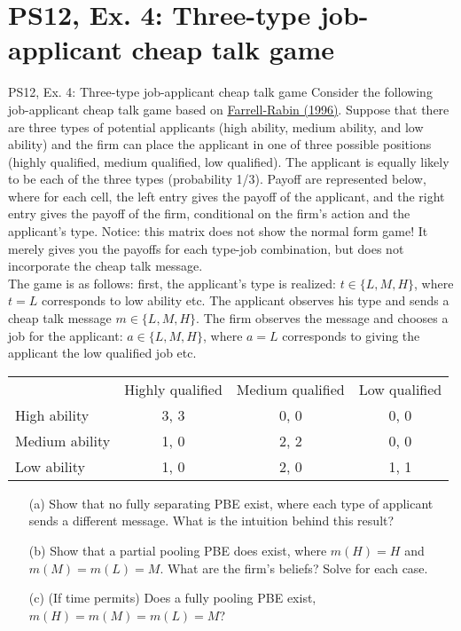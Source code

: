 \section{PS12, Ex. 4: Three-type job-applicant cheap talk game}

\begin{frame}{PS12, Ex. 4: Three-type job-applicant cheap talk game}
    Consider the following job-applicant cheap talk game based on \href{https://www.aeaweb.org/articles?id=10.1257/jep.10.3.103}{Farrell-Rabin (1996)}. Suppose that there are three types of potential applicants (high ability, medium ability, and low ability) and the firm can place the applicant in one of three possible positions (highly qualified, medium qualified, low qualified). The applicant is equally likely to be each of the three types (probability 1/3). Payoff are represented below, where for each cell, the left entry gives the payoff of the applicant, and the right entry gives the payoff of the firm, conditional on the firm’s action and the applicant’s type. Notice: this matrix does not show the normal form game! It merely gives you the payoffs for each type-job combination, but does not incorporate the cheap talk message.\\
    The game is as follows: first, the applicant’s type is realized: $t\in\{L,M,H\}$, where $t=L$ corresponds to low ability etc. The applicant observes his type and sends a cheap talk message $m\in\{L,M,H\}$. The firm observes the message and chooses a job for the applicant: $a\in\{L,M,H\}$, where $a=L$ corresponds to giving the applicant the low qualified job etc.\vspace{-14pt}
    \begin{table}
      \begin{tabular}{l|c|c|c|}
          \multicolumn{1}{c}{} & \multicolumn{1}{c}{Highly qualified} & \multicolumn{1}{c}{Medium qualified} & \multicolumn{1}{c}{Low qualified} \\\cline{2-4}
          High ability   & 3, 3 & 0, 0 & 0, 0 \\\cline{2-4}
          Medium ability & 1, 0 & 2, 2 & 0, 0 \\\cline{2-4}
          Low ability    & 1, 0 & 2, 0 & 1, 1 \\\cline{2-4}
      \end{tabular}
    \end{table}\vspace{-8pt}
    \begin{itemize}
      \item[(a)] Show that no fully separating PBE exist, where each type of applicant sends a different message. What is the intuition behind this result?
      \item[(b)] Show that a partial pooling PBE does exist, where $m(H)=H$ and $m(M)=m(L)=M$. What are the firm's beliefs? Solve for each case.
      \item[(c)] (If time permits) Does a fully pooling PBE exist, $m(H)=m(M)=m(L)=M$?
    \end{itemize}\vspace{-6pt}
    \vfill\null
\end{frame}



